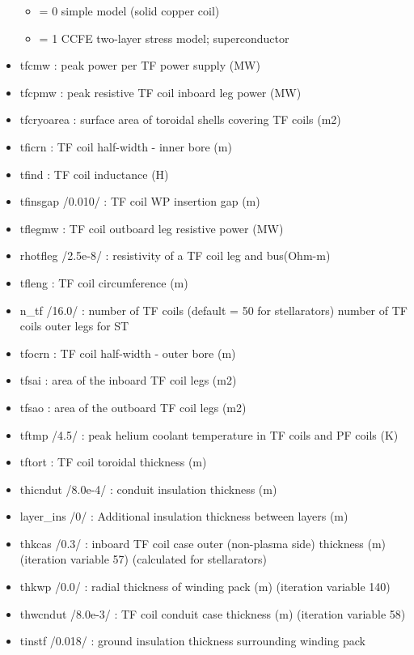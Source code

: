 \documentclass[]{article}
\providecommand{\tightlist}{%
  \setlength{\itemsep}{0pt}\setlength{\parskip}{0pt}}
\begin{document}
\begin{itemize}
  \begin{itemize}
  \tightlist
  \item
    = 0 simple model (solid copper coil)
  \item
    = 1 CCFE two-layer stress model; superconductor
  \end{itemize}
\item
  tfcmw : peak power per TF power supply (MW)
\item
  tfcpmw : peak resistive TF coil inboard leg power (MW)
\item
  tfcryoarea : surface area of toroidal shells covering TF coils (m2)
\item
  tficrn : TF coil half-width - inner bore (m)
\item
  tfind : TF coil inductance (H)
\item
  tfinsgap /0.010/ : TF coil WP insertion gap (m)
\item
  tflegmw : TF coil outboard leg resistive power (MW)
\item
  rhotfleg /2.5e-8/ : resistivity of a TF coil leg and bus(Ohm-m)
\item
  tfleng : TF coil circumference (m)
\item
  n_tf /16.0/ : number of TF coils (default = 50 for stellarators)
  number of TF coils outer legs for ST
\item
  tfocrn : TF coil half-width - outer bore (m)
\item
  tfsai : area of the inboard TF coil legs (m2)
\item
  tfsao : area of the outboard TF coil legs (m2)
\item
  tftmp /4.5/ : peak helium coolant temperature in TF coils and PF coils
  (K)
\item
  tftort : TF coil toroidal thickness (m)
\item
  thicndut /8.0e-4/ : conduit insulation thickness (m)
\item
  layer\_ins /0/ : Additional insulation thickness between layers (m)
\item
  thkcas /0.3/ : inboard TF coil case outer (non-plasma side) thickness
  (m) (iteration variable 57) (calculated for stellarators)
\item
  thkwp /0.0/ : radial thickness of winding pack (m) (iteration variable
  140)
\item
  thwcndut /8.0e-3/ : TF coil conduit case thickness (m) (iteration
  variable 58)
\item
  tinstf /0.018/ : ground insulation thickness surrounding winding pack

\end{itemize}
\end{document}
